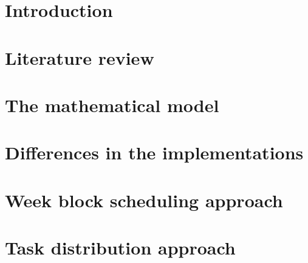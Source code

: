 \documentclass[a4paper, 10pt, twoside, openright]{book}
\begin{document}
\tableofcontents 
\begin{samepage}
\listoffigures
\let\clearpage\relax
\listoftables
\end{samepage}


\mainmatter


\chapter{Introduction}\label{chap:intro}



\chapter{Literature review}\label{chap:lit}



\chapter{The mathematical model}\label{chap:mathmod}



\chapter{Differences in the implementations}\label{chap:impl}



\chapter{Week block scheduling approach}\label{chap:weekly}



\chapter{Task distribution approach}\label{chap:taskdist}


\end{document}
